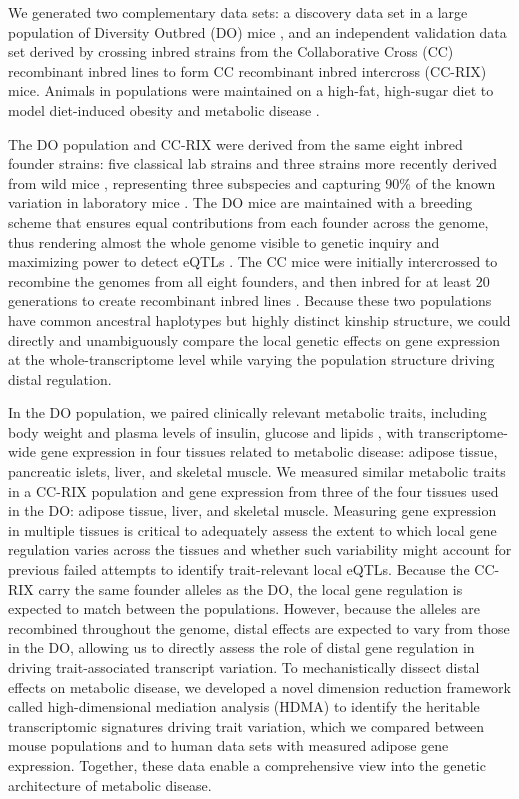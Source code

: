 \documentclass[
]{article}
\begin{document}
We generated two complementary data sets: a discovery data set in a
large population of Diversity Outbred (DO) mice \cite{pmid22892839}, and
an independent validation data set derived by crossing inbred strains
from the Collaborative Cross (CC) recombinant inbred lines
\cite{pmid18716833} to form CC recombinant inbred intercross (CC-RIX)
mice. Animals in populations were maintained on a high-fat, high-sugar
diet to model diet-induced obesity and metabolic disease
\cite{pmid29567659}.

The DO population and CC-RIX were derived from the same eight inbred
founder strains: five classical lab strains and three strains more
recently derived from wild mice \cite{pmid22892839}, representing three
subspecies and capturing 90\% of the known variation in laboratory mice
\cite{pmid31133439}. The DO mice are maintained with a breeding scheme
that ensures equal contributions from each founder across the genome,
thus rendering almost the whole genome visible to genetic inquiry and
maximizing power to detect eQTLs \cite{pmid22892839}. The CC mice were
initially intercrossed to recombine the genomes from all eight founders,
and then inbred for at least 20 generations to create recombinant inbred
lines \cite{pmid18716833, pmid21411855, 
pmid31133439}. Because these two populations have common ancestral
haplotypes but highly distinct kinship structure, we could directly and
unambiguously compare the local genetic effects on gene expression at
the whole-transcriptome level while varying the population structure
driving distal regulation.

In the DO population, we paired clinically relevant metabolic traits,
including body weight and plasma levels of insulin, glucose and lipids
\cite{pmid29567659}, with transcriptome-wide gene expression in four
tissues related to metabolic disease: adipose tissue, pancreatic islets,
liver, and skeletal muscle. We measured similar metabolic traits in a
CC-RIX population and gene expression from three of the four tissues
used in the DO: adipose tissue, liver, and skeletal muscle. Measuring
gene expression in multiple tissues is critical to adequately assess the
extent to which local gene regulation varies across the tissues and
whether such variability might account for previous failed attempts to
identify trait-relevant local eQTLs. Because the CC-RIX carry the same
founder alleles as the DO, the local gene regulation is expected to
match between the populations. However, because the alleles are
recombined throughout the genome, distal effects are expected to vary
from those in the DO, allowing us to directly assess the role of distal
gene regulation in driving trait-associated transcript variation. To
mechanistically dissect distal effects on metabolic disease, we
developed a novel dimension reduction framework called high-dimensional
mediation analysis (HDMA) to identify the heritable transcriptomic
signatures driving trait variation, which we compared between mouse
populations and to human data sets with measured adipose gene
expression. Together, these data enable a comprehensive view into the
genetic architecture of metabolic disease.
\end{document}
